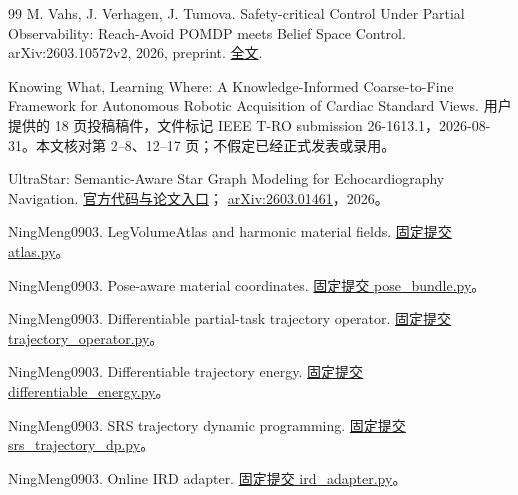 \documentclass[11pt,a4paper,fontset=fandol]{ctexart}
\theoremstyle{definition}
\theoremstyle{remark}\newtheorem{remark}[theorem]{说明}
\numberwithin{equation}{section}
\begin{document}
\begin{thebibliography}{99}
M. Vahs, J. Verhagen, J. Tumova.
Safety-critical Control Under Partial Observability: Reach-Avoid POMDP meets Belief Space Control.
arXiv:2603.10572v2, 2026, preprint.
\href{https://arxiv.org/html/2603.10572v2}{全文}.

Knowing What, Learning Where: A Knowledge-Informed Coarse-to-Fine Framework for Autonomous Robotic Acquisition of Cardiac Standard Views.
用户提供的 18 页投稿稿件，文件标记 IEEE T-RO submission 26-1613.1，2026-08-31。本文核对第 2--8、12--17 页；不假定已经正式发表或录用。

UltraStar: Semantic-Aware Star Graph Modeling for Echocardiography Navigation.
\href{https://github.com/LeapLabTHU/UltraStar}{官方代码与论文入口}；
\href{https://arxiv.org/abs/2603.01461}{arXiv:2603.01461}，2026。

NingMeng0903. LegVolumeAtlas and harmonic material fields.
\href{https://github.com/NingMeng0903/RealUS_playground/blob/190e9e3cec96f2a467884b545e465364cfc76501/src/projects/genesis_ue_sync/anatomy_retarget/leg_volume_coordinates/atlas.py}{固定提交 atlas.py}。

NingMeng0903. Pose-aware material coordinates.
\href{https://github.com/NingMeng0903/RealUS_playground/blob/190e9e3cec96f2a467884b545e465364cfc76501/src/projects/genesis_ue_sync/anatomy_retarget/leg_volume_coordinates/pose_bundle.py}{固定提交 pose\_bundle.py}。

NingMeng0903. Differentiable partial-task trajectory operator.
\href{https://github.com/NingMeng0903/RealUS_playground/blob/190e9e3cec96f2a467884b545e465364cfc76501/ird_playground/ird_playground/region/trajectory_operator.py}{固定提交 trajectory\_operator.py}。

NingMeng0903. Differentiable trajectory energy.
\href{https://github.com/NingMeng0903/RealUS_playground/blob/190e9e3cec96f2a467884b545e465364cfc76501/ird_playground/ird_playground/optimization/differentiable_energy.py}{固定提交 differentiable\_energy.py}。

NingMeng0903. SRS trajectory dynamic programming.
\href{https://github.com/NingMeng0903/RealUS_playground/blob/190e9e3cec96f2a467884b545e465364cfc76501/ird_playground/ird_playground/optimization/srs_trajectory_dp.py}{固定提交 srs\_trajectory\_dp.py}。

NingMeng0903. Online IRD adapter.
\href{https://github.com/NingMeng0903/RealUS_playground/blob/190e9e3cec96f2a467884b545e465364cfc76501/rm75_control/rm75_control/control/joint_admittance_8dof/tasks/ird_adapter.py}{固定提交 ird\_adapter.py}。

\end{thebibliography}
\end{document}
